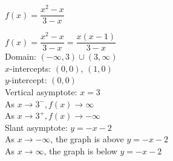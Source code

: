 {$f(x) = \dfrac{x^2-x}{3-x}$}
{$f(x) = \dfrac{x^2-x}{3-x} = \dfrac{x(x-1)}{3-x}$\\
Domain: $(-\infty, 3) \cup (3, \infty)$\\
$x$-intercepts:  $(0,0)$, $(1,0)$\\
$y$-intercept:  $(0,0)$\\
Vertical asymptote: $x = 3$\\
As $x \rightarrow 3^{-}, f(x) \rightarrow \infty$\\
As $x \rightarrow 3^{+}, f(x) \rightarrow -\infty$\\
Slant asymptote: $y = -x-2$ \\
As $x \rightarrow -\infty$, the graph is above $y=-x-2$\\
As $x \rightarrow \infty$, the graph is below $y=-x-2$

\begin{center}
\end{center}}